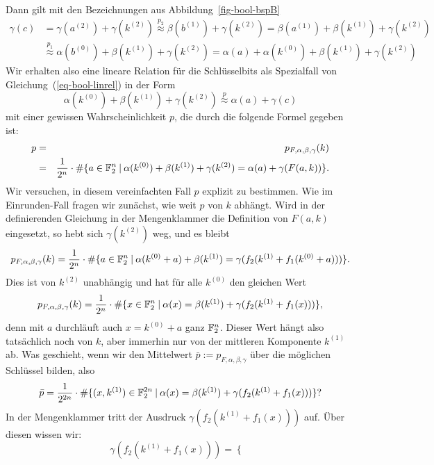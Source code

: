 \begin{refsegment}
Dann gilt mit den Bezeichnungen aus Abbildung~\ref{fig-bool-bspB}
\begin{align*}
   \gamma(c) & = \gamma(a^{(2)}) + \gamma(k^{(2)})
                   \stackrel{p_2}{\approx} \beta(b^{(1)}) + \gamma(k^{(2)})
                   = \beta(a^{(1)}) + \beta(k^{(1)}) + \gamma(k^{(2)}) \\
             & \stackrel{p_1}{\approx} \alpha(b^{(0)}) + \beta(k^{(1)}) + \gamma(k^{(2)})
                   = \alpha(a) + \alpha(k^{(0)}) + \beta(k^{(1)}) + \gamma(k^{(2)})
\end{align*}
Wir erhalten also eine lineare Relation für die Schlüsselbits als Spezialfall
von Gleichung~(\ref{eq-bool-linrel}) in der Form
\[
   \alpha(k^{(0)}) + \beta(k^{(1)}) + \gamma(k^{(2)}) \stackrel{p}{\approx}
      \alpha(a) + \gamma(c)
\]
mit einer gewissen Wahrscheinlichkeit $p$, die durch die folgende
Formel gegeben ist:
\begin{eqnarray*}
     p & = & p_{F,\alpha,\beta,\gamma}(k) \\
       & = & \frac{1}{2^n}\cdot \#\{a \in \mathbb{F}_2^n \:|\:
        \alpha(k^{(0)}) + \beta(k^{(1)}) + \gamma(k^{(2)}) = \alpha(a) + \gamma(F(a,k))\}.
\end{eqnarray*}
Wir versuchen, in diesem vereinfachten Fall $p$ explizit zu bestimmen.
Wie im Einrunden-Fall fragen wir zunächst, wie weit $p$ von $k$ abhängt.
Wird in der definierenden Gleichung in der Mengenklammer die Definition
von $F(a,k)$ eingesetzt, so hebt sich $\gamma(k^{(2)})$ weg, und es bleibt
\[
   p_{F,\alpha,\beta,\gamma}(k) =
     \frac{1}{2^n}\cdot \#\{a \in \mathbb{F}_2^n \:|\:
        \alpha(k^{(0)} + a) + \beta(k^{(1)}) = \gamma(f_2(k^{(1)} + f_1(k^{(0)} + a)))\}.
\]
Dies ist von $k^{(2)}$ unabhängig und hat für alle $k^{(0)}$ den gleichen
Wert
\[
   p_{F,\alpha,\beta,\gamma}(k) =
     \frac{1}{2^n}\cdot \#\{x \in \mathbb{F}_2^n \:|\:
        \alpha(x) = \beta(k^{(1)}) + \gamma(f_2(k^{(1)} + f_1(x)))\},
\]
denn mit $a$ durchläuft auch $x = k^{(0)} + a$ ganz $\mathbb{F}_2^n$. Dieser Wert
hängt also tatsächlich noch von $k$, aber immerhin nur von der mittleren
Komponente $k^{(1)}$ ab. Was geschieht, wenn wir den Mittelwert
$\bar{p} := p_{F,\alpha,\beta,\gamma}$ über die möglichen Schlüssel bilden,
also
\[
   \bar{p} =
     \frac{1}{2^{2n}}\cdot \#\{(x,k^{(1)}) \in \mathbb{F}_2^{2n} \:|\:
        \alpha(x) = \beta(k^{(1)}) + \gamma(f_2(k^{(1)} + f_1(x)))\}?
\]
In der Mengenklammer tritt der Ausdruck $\gamma(f_2(k^{(1)} + f_1(x)))$ auf.
Über diesen wissen wir:
\[
     \gamma(f_2(k^{(1)} + f_1(x))) = \begin{cases}

\end{cases}\]
\end{refsegment}
